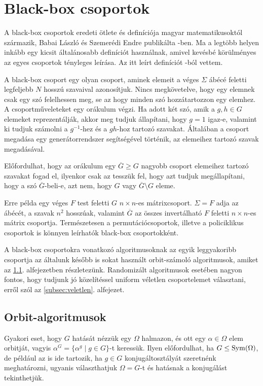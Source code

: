 \section{Black-box csoportok}
\label{sec:blackbox}
A black-box csoportok eredeti ötlete és definíciója magyar matematikusoktól származik,
Babai László és Szemerédi Endre publikálta \cite{BS84}-ben.
Ma a legtöbb helyen inkább egy kicsit általánosabb definíciót használnak, amivel kevésbé körülményes az
egyes csoportok tényleges leírása. Az itt leírt definíciót \cite{Ser03}-ból vettem.

A black-box csoport egy olyan csoport,
aminek elemeit a véges $\Sigma$ ábécé feletti legfeljebb $N$ hosszú szavaival azonosítjuk.
Nincs megkövetelve, hogy egy elemnek csak egy szó felelhessen meg, se az hogy minden szó hozzátartozzon
egy elemhez.
A csoportműveleteket egy orákulum végzi.
Ha adott két szó, amik a $g, h\in G$ elemeket reprezentálják,
akkor meg tudjuk állapítani, hogy $g=1$ igaz-e,
valamint ki tudjuk számolni a $g^{-1}$-hez és a $gh$-hoz tartozó szavakat.
Általában a csoport megadása egy generátorrendszer segítségével történik, az elemeihez tartozó szavak megadásával.

Előfordulhat, hogy az orákulum egy $\overline{G} \ge G$ nagyobb csoport elemeihez tartozó szavakat fogad el,
ilyenkor csak az tesszük fel, hogy azt tudjuk megállapítani, hogy a szó $\overline{G}$-beli-e,
azt nem, hogy $G$ vagy $\overline{G}\setminus G$ eleme.

Erre példa egy véges $F$ test feletti $G$ $n\times n$-es mátrixcsoport.
$\Sigma=F$ adja az ábécét, a szavak $n^2$ hosszúak,
valamint $\overline{G}$ az összes invertálható $F$ feletti $n\times n$-es mátrix csoportja.
Természetesen a permutációcsoportok, illetve a policiklikus csoportok is könnyen leírhatók black-box csoportokként.

A black-box csoportokra vonatkozó algoritmusoknak az egyik leggyakoribb csoportja az általunk később is sokat használt
orbit-számoló algoritmusok, amiket az \ref{subsec:orbit}. alfejezetben részletezünk.
Randomizált algoritmusok esetében nagyon fontos, hogy tudjunk jó közelítéssel uniform véletlen csoportelemet választani,
erről szól az \ref{subsec:veletlen}. alfejezet.

\subsection{Orbit-algoritmusok}
\label{subsec:orbit}
Gyakori eset, hogy $G$ hatását nézzük egy $\Omega$ halmazon, és ott egy $\alpha\in\Omega$ elem orbitját,
vagyis $\alpha^G = \{ \alpha^g \mid g \in G \}$-t keressük. Ilyen előfordulhat, ha $G \le \operatorname{Sym}(\Omega)$,
de például az is ide tartozik, ha $g \in G$ konjugáltosztályát szeretnénk meghatározni, ugyanis választhatjuk
$\Omega=G$-t és hatásnak a konjugálást tekinthetjük.

